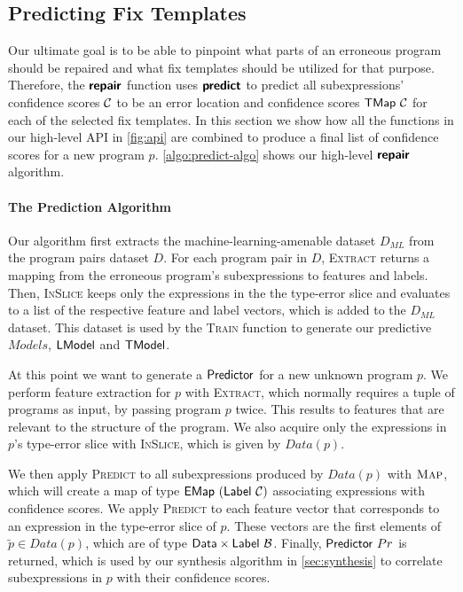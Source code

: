 

\subsection{Predicting Fix Templates}
\label{sec:templ-pred:predict}

Our ultimate goal is to be able to pinpoint what parts of an erroneous program
should be repaired and what fix templates should be utilized for that purpose.
Therefore, the $\bm{\mathsf{repair}}$ function uses $\bm{\mathsf{predict}}$ to predict all
subexpressions' confidence scores $\mathcal{C}$ to be an error location and confidence
scores $\mathsf{TMap}\ \mathcal{C}$ for each of the selected fix templates. In this section we
show how all the functions in our high-level API in \autoref{fig:api} are
combined to produce a final list of confidence scores for a new program $p$.
\autoref{algo:predict-algo} shows our high-level $\bm{\mathsf{repair}}$ algorithm.



\paragraph{The Prediction Algorithm}
Our algorithm first extracts the machine-learning-amenable dataset $D_{ML}$
from the program pairs dataset $D$. For each program pair in $D$,
\textsc{Extract} returns a mapping from the erroneous program's subexpressions
to features and labels. Then, \textsc{InSlice} keeps only the expressions in
the the type-error slice and evaluates to a list of the respective feature and
label vectors, which is added to the $D_{ML}$ dataset. This dataset
is used by the \textsc{Train} function to generate our predictive $Models$, \ie
$\mathsf{LModel}$ and $\mathsf{TModel}$.

At this point we want to generate a $\mathsf{Predictor}$ for a new unknown program
$p$. We perform feature extraction for $p$ with \textsc{Extract}, which normally
requires a tuple of programs as input, by passing program $p$ twice. This
results to features that are relevant to the structure of the program. We also
acquire only the expressions in $p$'s type-error slice with \textsc{InSlice},
which is given by $Data(p)$.

We then apply \textsc{Predict} to all subexpressions produced by $Data(p)$ with
$\textsc{Map}$, which will create a map of type $\mathsf{EMap}\ (\mathsf{Label}\ \mathcal{C})$
associating expressions with confidence scores. We apply \textsc{Predict} to
each feature vector that corresponds to an expression in the type-error slice of
$p$. These vectors are the first elements of $\tilde{p} \in Data(p)$, which are
of type $\mathsf{Data} \times \mathsf{Label}\ \mathcal{B}$. Finally, $\mathsf{Predictor}\ Pr$ is
returned, which is used by our synthesis algorithm in \autoref{sec:synthesis} to
correlate subexpressions in $p$ with their confidence scores.
